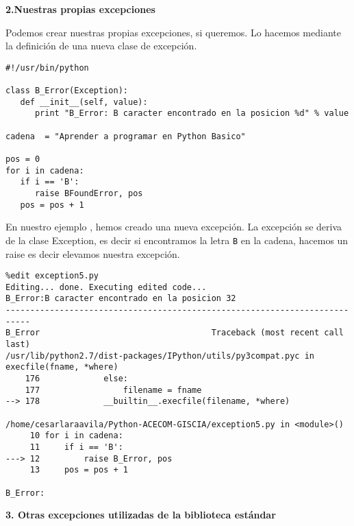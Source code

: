 \documentclass[twoside,10.5pt]{article}%
\begin{document}
\textbf{2.Nuestras propias excepciones}

\vspace{0.3cm}

Podemos crear nuestras propias excepciones, si queremos. Lo hacemos mediante la definici\'on de una nueva clase de excepci\'on.

\vspace{0.3cm}

\begin{verbatim}
#!/usr/bin/python

class B_Error(Exception):
   def __init__(self, value):
      print "B_Error: B caracter encontrado en la posicion %d" % value

cadena  = "Aprender a programar en Python Basico"

pos = 0
for i in cadena:
   if i == 'B':
      raise BFoundError, pos
   pos = pos + 1
\end{verbatim}


\vspace{0.3cm}

En nuestro ejemplo , hemos creado una nueva excepci\'on. La excepci\'on se deriva de la clase {\color{red} Exception}, es decir si encontramos la letra \texttt{B} en la  cadena, hacemos un  {\color{blue} raise } es decir elevamos   nuestra excepci\'on.

\vspace{0.3cm}

\begin{verbatim}
%edit exception5.py
Editing... done. Executing edited code...
B_Error:B caracter encontrado en la posicion 32
---------------------------------------------------------------------------
B_Error                                   Traceback (most recent call last)
/usr/lib/python2.7/dist-packages/IPython/utils/py3compat.pyc in execfile(fname, *where)
    176             else:
    177                 filename = fname
--> 178             __builtin__.execfile(filename, *where)

/home/cesarlaraavila/Python-ACECOM-GISCIA/exception5.py in <module>()
     10 for i in cadena:
     11     if i == 'B':
---> 12         raise B_Error, pos
     13     pos = pos + 1

B_Error: 
\end{verbatim}

\textbf{3. Otras excepciones utilizadas de la biblioteca est\'andar}

\vspace{0.3cm}
\end{document}
